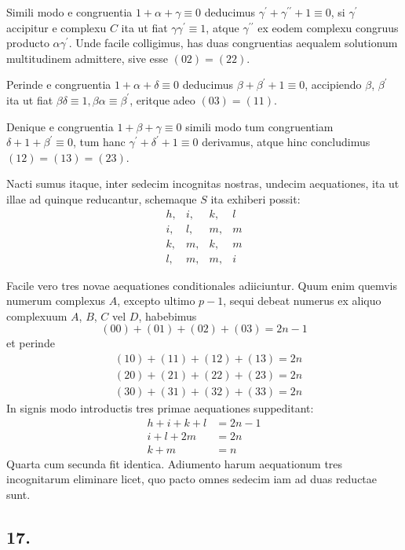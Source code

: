\documentclass[twoside,12pt, showframe]{memoir}
\begin{document}
Simili modo e congruentia \(1+\alpha+\gamma \equiv 0\) deducimus \(\gamma^{\prime}+\gamma^{\prime \prime}+1 \equiv 0\), si \(\gamma^{\prime}\) accipitur e complexu \(C\) ita ut fiat \(\gamma \gamma^{\prime} \equiv 1\), atque \(\gamma^{\prime \prime}\) ex eodem complexu congruus producto \(\alpha \gamma^{\prime}\). Unde facile colligimus, has duas congruentias aequalem solutionum multitudinem admittere, sive esse \((02)=(22)\).
 
Perinde e congruentia \(1+\alpha+\delta \equiv 0\) deducimus \(\beta+\beta^{\prime}+1 \equiv 0\), accipiendo \(\beta\), \(\beta^{\prime}\) ita ut fiat \(\beta \delta \equiv 1, \beta \alpha \equiv \beta^{\prime}\), eritque adeo \((03)=(11)\).
 
Denique e congruentia \(1+\beta+\gamma \equiv 0\) simili modo tum congruentiam \(\delta+1+\beta^{\prime} \equiv 0\), tum hanc \(\gamma^{\prime}+\delta^{\prime}+1 \equiv 0\) derivamus, atque hinc concludimus \((12)=(13)=(23)\).
 
Nacti sumus itaque, inter sedecim incognitas nostras, undecim aequationes, ita ut illae ad quinque reducantur, schemaque \(S\) ita exhiberi possit:
\[\begin{array}{llll}
h, & i, & k, & l \\
i, & l, & m, & m \\
k, & m, & k, & m \\
l, & m, & m, & i
\end{array}\]

Facile vero tres novae aequationes conditionales adiiciuntur. Quum enim quemvis numerum complexus \(A\), excepto ultimo \(p-1\), sequi debeat numerus ex aliquo complexuum \(A\), \(B\), \(C\) vel \(D\), habebimus
\[(00)+(01)+(02)+(03)=2 n-1\]
et perinde
\[\begin{aligned}
& (10)+(11)+(12)+(13)=2 n \\
& (20)+(21)+(22)+(23)=2 n \\
& (30)+(31)+(32)+(33)=2 n
\end{aligned}\]
In signis modo introductis tres primae aequationes suppeditant:
\[\begin{aligned}
h+i+k+l & =2 n-1 \\
i+l+2 m & =2 n \\
k+m & =n
\end{aligned}\]\clearpage\noindent%
Quarta cum secunda fit identica. Adiumento harum aequationum tres incognitarum eliminare licet, quo pacto omnes sedecim iam ad duas reductae sunt.

\subsection*{17.}
 
\end{document}

